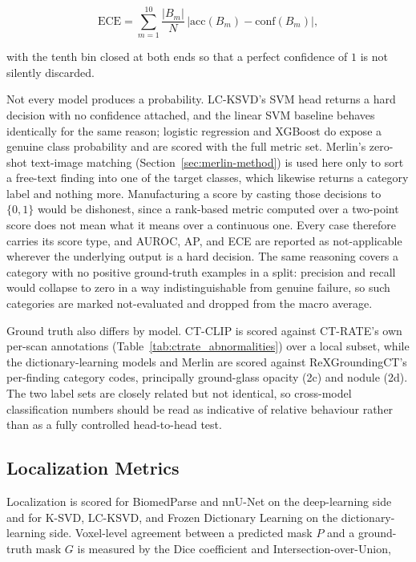 \begin{equation}[Expected Calibration Error]
\mathrm{ECE} = \sum_{m=1}^{10} \frac{|B_m|}{N}\,\bigl|\mathrm{acc}(B_m) - \mathrm{conf}(B_m)\bigr|,
\label{eq:ece}
\end{equation}

\noindent with the tenth bin closed at both ends so that a perfect confidence of $1$ is not silently discarded.

Not every model produces a probability. LC-KSVD's SVM head returns a hard decision with no
confidence attached, and the linear SVM baseline behaves identically for the same reason;
logistic regression and XGBoost do expose a genuine class probability and are scored with
the full metric set. Merlin's zero-shot text-image matching
(Section~\ref{sec:merlin-method}) is used here only to sort a free-text finding into one of
the target classes, which likewise returns a category label and nothing more. Manufacturing
a score by casting those decisions to $\{0,1\}$ would be dishonest, since a rank-based
metric computed over a two-point score does not mean what it means over a continuous one.
Every case therefore carries its score type, and AUROC, AP, and ECE are reported as
not-applicable wherever the underlying output is a hard decision. The same reasoning covers
a category with no positive ground-truth examples in a split: precision and recall would
collapse to zero in a way indistinguishable from genuine failure, so such categories are
marked not-evaluated and dropped from the macro average.

Ground truth also differs by model. CT-CLIP is scored against CT-RATE's own per-scan
annotations (Table~\ref{tab:ctrate_abnormalities}) over a local subset, while the
dictionary-learning models and Merlin are scored against ReXGroundingCT's per-finding
category codes, principally ground-glass opacity (2c) and nodule (2d). The two label sets
are closely related but not identical, so cross-model classification numbers should be read
as indicative of relative behaviour rather than as a fully controlled head-to-head test.

\subsection{Localization Metrics}
\label{sec:eval-localization}

Localization is scored for BiomedParse and nnU-Net on the deep-learning side and for K-SVD,
LC-KSVD, and Frozen Dictionary Learning on the dictionary-learning side. Voxel-level
agreement between a predicted mask $P$ and a ground-truth mask $G$ is measured by the Dice
coefficient and Intersection-over-Union,

